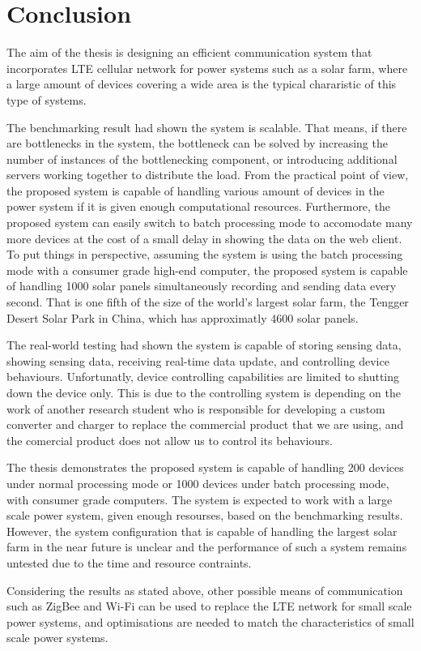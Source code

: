 \documentclass[../thesis.tex]{subfiles}
\begin{document}
\chapter{Conclusion}

The aim of the thesis is designing an efficient communication system that incorporates LTE cellular network for power systems such as a solar farm, where a large amount of devices covering a wide area is the typical chararistic of this type of systems. 

The benchmarking result had shown the system is scalable. That means, if there are bottlenecks in the system, the bottleneck can be solved by increasing the number of instances of the bottlenecking component, or introducing additional servers working together to distribute the load. From the practical point of view, the proposed system is capable of handling various amount of devices in the power system if it is given enough computational resources. Furthermore, the proposed system can easily switch to batch processing mode to accomodate many more devices at the cost of a small delay in showing the data on the web client. To put things in perspective, assuming the system is using the batch processing mode with a consumer grade high-end computer, the proposed system is capable of handling 1000 solar panels simultaneously recording and sending data every second. That is one fifth of the size of the world's largest solar farm, the Tengger Desert Solar Park in China, which has approximatly 4600 solar panels\cite{gienergy}. 

The real-world testing had shown the system is capable of storing sensing data, showing sensing data, receiving real-time data update, and controlling device behaviours. Unfortunatly, device controlling capabilities are limited to shutting down the device only. This is due to the controlling system is depending on the work of another research student who is responsible for developing a custom converter and charger to replace the commercial product that we are using, and the comercial product does not allow us to control its behaviours. 

The thesis demonstrates the proposed system is capable of handling 200 devices under normal processing mode or 1000 devices under batch processing mode, with consumer grade computers. The system is expected to work with a large scale power system, given enough resourses, based on the benchmarking results. However, the system configuration that is capable of handling the largest solar farm in the near future is unclear and the performance of such a system remains untested due to the time and resource contraints. 

Considering the results as stated above, other possible means of communication such as ZigBee and Wi-Fi can be used to replace the LTE network for small scale power systems, and optimisations are needed to match the characteristics of small scale power systems.
\end{document}
